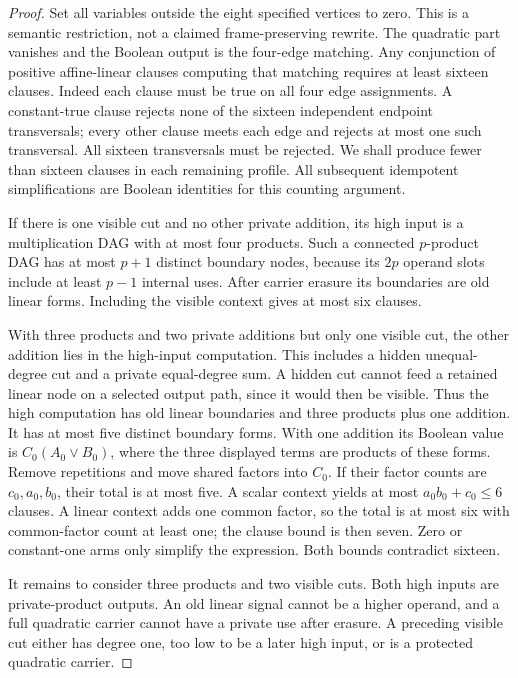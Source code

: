 \documentclass[11pt]{article}
\theoremstyle{definition}
\theoremstyle{remark}
\begin{document}
\begin{proof}
Set all variables outside the eight specified vertices to zero. This is a semantic restriction, not a claimed frame-preserving rewrite. The quadratic part vanishes and the Boolean output is the four-edge matching. Any conjunction of positive affine-linear clauses computing that matching requires at least sixteen clauses. Indeed each clause must be true on all four edge assignments. A constant-true clause rejects none of the sixteen independent endpoint transversals; every other clause meets each edge and rejects at most one such transversal. All sixteen transversals must be rejected. We shall produce fewer than sixteen clauses in each remaining profile. All subsequent idempotent simplifications are Boolean identities for this counting argument.

If there is one visible cut and no other private addition, its high input is a multiplication DAG with at most four products. Such a connected $p$-product DAG has at most $p+1$ distinct boundary nodes, because its $2p$ operand slots include at least $p-1$ internal uses. After carrier erasure its boundaries are old linear forms. Including the visible context gives at most six clauses.

With three products and two private additions but only one visible cut, the other addition lies in the high-input computation. This includes a hidden unequal-degree cut and a private equal-degree sum. A hidden cut cannot feed a retained linear node on a selected output path, since it would then be visible. Thus the high computation has old linear boundaries and three products plus one addition. It has at most five distinct boundary forms. With one addition its Boolean value is $C_0(A_0\vee B_0)$, where the three displayed terms are products of these forms. Remove repetitions and move shared factors into $C_0$. If their factor counts are $c_0,a_0,b_0$, their total is at most five. A scalar context yields at most $a_0b_0+c_0\le6$ clauses. A linear context adds one common factor, so the total is at most six with common-factor count at least one; the clause bound is then seven. Zero or constant-one arms only simplify the expression. Both bounds contradict sixteen.

It remains to consider three products and two visible cuts. Both high inputs are private-product outputs. An old linear signal cannot be a higher operand, and a full quadratic carrier cannot have a private use after erasure. A preceding visible cut either has degree one, too low to be a later high input, or is a protected quadratic carrier.


\end{proof}
\end{document}
